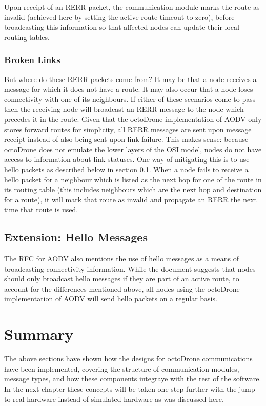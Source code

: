 Upon receipt of an RERR packet, the communication module marks the route as invalid (achieved here by setting the active route timeout to zero), before broadcasting this information so that affected nodes can update their local routing tables.

\subsubsection{Broken Links}
But where do these RERR packets come from? It may be that a node receives a message for which it does not have a route. It may also occur that a node loses connectivity with one of its neighbours. If either of these scenarios come to pass then the receiving node will broadcast an RERR message to the node which precedes it in the route. Given that the octoDrone implementation of AODV only stores forward routes for simplicity, all RERR messages are sent upon message receipt instead of also being sent upon link failure. This makes sense: because octoDrone does not emulate the lower layers of the OSI model, nodes do not have access to information about link statuses. One way of mitigating this is to use hello packets as described below in section \ref{hello}. When a node fails to receive a hello packet for a neighbour which is listed as the next hop for one of the route in its routing table (this includes neighbours which are the next hop and destination for a route), it will mark that route as invalid and propagate an RERR the next time that route is used.

\subsection{Extension: Hello Messages}
\label{hello}
The RFC for AODV also mentions the use of hello messages as a means of broadcasting connectivity information. While the document suggests that nodes should only broadcast hello messages if they are part of an active route, to account for the differences mentioned above, all nodes using the octoDrone implementation of AODV will send hello packets on a regular basis.

\section{Summary}
The above sections have shown how the designs for octoDrone communications have been implemented, covering the structure of communication modules, message types, and how these components integraye with the rest of the software. In the next chapter these concepts will be taken one step further with the jump to real hardware instead of simulated hardware as was discussed here.